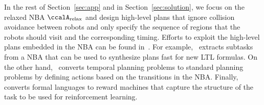 \documentclass[Afour,sageh,times]{sagej}
\newcommand{\auto}[1]{\ccalA_{\textup{#1}}}
\begin{document}
{In the rest of Section~\ref{sec:app} and in Section~\ref{sec:solution}, we focus on the relaxed NBA $\auto{relax}$ and design high-level plans that ignore collision avoidance between robots and only specify the sequence of regions that the robots should visit and the corresponding timing. Efforts to exploit the high-level plans embedded in the NBA can be found in~\cite{xluo_CDC19,camacho2017non,camacho2019ltl}. For example,~\cite{xluo_CDC19} extracts subtasks from a NBA that can be used to synthesize plans fast for new LTL formulas. On the other hand,~\cite{camacho2017non} converts temporal planning problems to standard planning problems by defining actions based on the transitions in the NBA. Finally,~\cite{camacho2019ltl} converts formal languages to reward machines that capture the structure of the task to be used for reinforcement learning.




}
\end{document}
